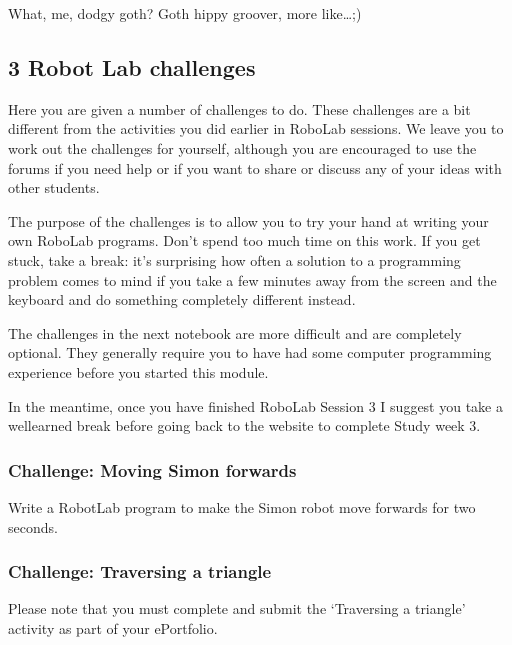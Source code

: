 \documentclass[letterpaper,10pt,english]{sphinxmanual}
\let\sphinxpxdimen\pdfpxdimen\else\newdimen\sphinxpxdimen
\begin{document}
What, me, dodgy goth? Goth hippy groover, more like…;\sphinxhyphen{})


\subsection{3 Robot Lab challenges}
\label{\detokenize{content/02_Robot_Lab/Section_00_03:3-Robot-Lab-challenges}}\label{\detokenize{content/02_Robot_Lab/Section_00_03::doc}}
Here you are given a number of challenges to do. These challenges are a bit different from the activities you did earlier in RoboLab sessions. We leave you to work out the challenges for yourself, although you are encouraged to use the forums if you need help or if you want to share or discuss any of your ideas with other students.

The purpose of the challenges is to allow you to try your hand at writing your own RoboLab programs. Don’t spend too much time on this work. If you get stuck, take a break: it’s surprising how often a solution to a programming problem comes to mind if you take a few minutes away from the screen and the keyboard and do something completely different instead.

The challenges in the next notebook are more difficult and are completely optional. They generally require you to have had some computer programming experience before you started this module.

In the meantime, once you have finished RoboLab Session 3 I suggest you take a well\sphinxhyphen{}earned break before going back to the website to complete Study week 3.


\subsubsection{Challenge: Moving Simon forwards}
\label{\detokenize{content/02_Robot_Lab/Section_00_03:Challenge:-Moving-Simon-forwards}}
Write a RobotLab program to make the Simon robot move forwards for two seconds.


\subsubsection{Challenge: Traversing a triangle}
\label{\detokenize{content/02_Robot_Lab/Section_00_03:Challenge:-Traversing-a-triangle}}


\sphinxincludegraphics[width=32\sphinxpxdimen,height=32\sphinxpxdimen]{{tm129_portfolio_activity_32}.png} Please note that you must complete and submit the ‘Traversing a triangle’ activity as part of your ePortfolio.
\end{document}
